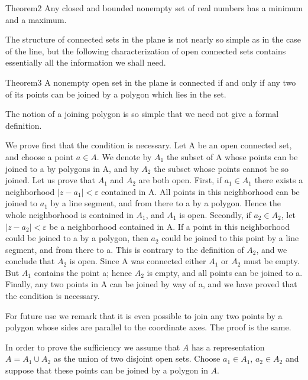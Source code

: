 \begin{originalstatement}{Theorem}{2}\label{thm:3.2}
Any closed and bounded nonempty set of real numbers has a minimum and a maximum.
\end{originalstatement}
The structure of connected sets in the plane is not nearly so simple as in the case of the line, but the following characterization of open connected sets contains essentially all the information we shall need.

\begin{originalstatement}{Theorem}{3}\label{thm:3.3}
A nonempty open set in the plane is connected if and only if any two of its points can be joined by a polygon which lies in the set.
\end{originalstatement}
The notion of a joining polygon is so simple that we need not give a formal definition.

We prove first that the condition is necessary. Let A be an open connected set, and choose a point $a \in A$. We denote by $A_{1}$ the subset of A whose points can be joined to a by polygons in A, and by $A_{2}$ the subset whose points cannot be so joined. Let us prove that $A_{1}$ and $A_{2}$ are both open. First, if $a_{1} \in A_{1}$ there exists a neighborhood $|z - a_{1}| < \varepsilon$ contained in A. All points in this neighborhood can be joined to $a_{1}$ by a line segment, and from there to a by a polygon. Hence the whole neighborhood is contained in $A_{1}$, and $A_{1}$ is open. Secondly, if $a_{2} \in A_{2}$, let $|z - a_{2}| < \varepsilon$ be a neighborhood contained in A. If a point in this neighborhood could be joined to a by a polygon, then $a_{2}$ could be joined to this point by a line segment, and from there to a. This is contrary to the definition of $A_{2}$, and we conclude that $A_{2}$ is open. Since A was connected either $A_{1}$ or $A_{2}$ must be empty. But $A_{1}$ contains the point a; hence $A_{2}$ is empty, and all points can be joined to a. Finally, any two points in A can be joined by way of a, and we have proved that the condition is necessary.

For future use we remark that it is even possible to join any two points by a polygon whose sides are parallel to the coordinate axes. The proof is the same.

In order to prove the sufficiency we assume that $A$ has a representation $A = A_1 \cup A_2$ as the union of two disjoint open sets. Choose $a_1 \in A_1$, $a_2 \in A_2$ and suppose that these points can be joined by a polygon in $A$.



